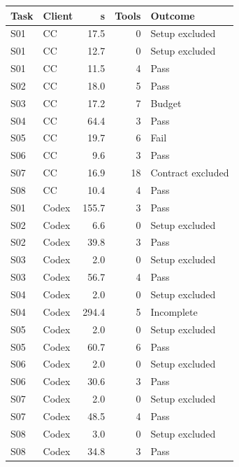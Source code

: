 \documentclass[11pt,a4paper]{ctexart}
\begin{document}
\begin{longtable}{llrrl}\toprule Task & Client & s & Tools & Outcome\\\midrule\endhead

S01 & CC & 17.5 & 0 & Setup excluded \\

S01 & CC & 12.7 & 0 & Setup excluded \\

S01 & CC & 11.5 & 4 & Pass \\

S02 & CC & 18.0 & 5 & Pass \\

S03 & CC & 17.2 & 7 & Budget \\

S04 & CC & 64.4 & 3 & Pass \\

S05 & CC & 19.7 & 6 & Fail \\

S06 & CC & 9.6 & 3 & Pass \\

S07 & CC & 16.9 & 18 & Contract excluded \\

S08 & CC & 10.4 & 4 & Pass \\

S01 & Codex & 155.7 & 3 & Pass \\

S02 & Codex & 6.6 & 0 & Setup excluded \\

S02 & Codex & 39.8 & 3 & Pass \\

S03 & Codex & 2.0 & 0 & Setup excluded \\

S03 & Codex & 56.7 & 4 & Pass \\

S04 & Codex & 2.0 & 0 & Setup excluded \\

S04 & Codex & 294.4 & 5 & Incomplete \\

S05 & Codex & 2.0 & 0 & Setup excluded \\

S05 & Codex & 60.7 & 6 & Pass \\

S06 & Codex & 2.0 & 0 & Setup excluded \\

S06 & Codex & 30.6 & 3 & Pass \\

S07 & Codex & 2.0 & 0 & Setup excluded \\

S07 & Codex & 48.5 & 4 & Pass \\

S08 & Codex & 3.0 & 0 & Setup excluded \\

S08 & Codex & 34.8 & 3 & Pass \\

\bottomrule\end{longtable}
\end{document}

